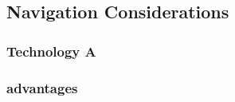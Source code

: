 \documentclass[../report.tex]{subfiles}
\begin{document}
    \subsection{Navigation Considerations}
    \subsubsection{Technology A}
    \subsubsection{advantages}
\end{document}
